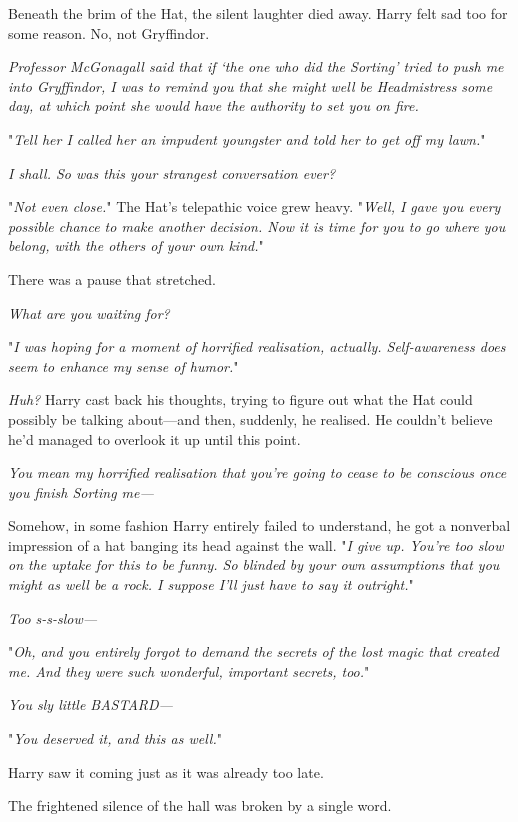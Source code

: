 Beneath the brim of the Hat, the silent laughter died away. Harry felt sad too
for some reason. No, not Gryffindor.

\emph{Professor McGonagall said that if `the one who did the Sorting' tried to
push me into Gryffindor, I was to remind you that she might well be
Headmistress some day, at which point she would have the authority to set you on
fire.}

"\emph{Tell her I called her an impudent youngster and told her to get off my
lawn.}"

\emph{I shall. So was this your strangest conversation ever?}

"\emph{Not even close.}" The Hat's telepathic voice grew heavy. "\emph{Well, I
gave you every possible chance to make another decision. Now it is time for you
to go where you belong, with the others of your own kind.}"

There was a pause that stretched.

\emph{What are you waiting for?}

"\emph{I was hoping for a moment of horrified realisation, actually.
Self-awareness does seem to enhance my sense of humor.}"

\emph{Huh?} Harry cast back his thoughts, trying to figure out what the Hat
could possibly be talking about---and then, suddenly, he realised. He couldn't
believe he'd managed to overlook it up until this point.

\emph{You mean my horrified realisation that you're going to cease to be
conscious once you finish Sorting me---}

Somehow, in some fashion Harry entirely failed to understand, he got a
nonverbal impression of a hat banging its head against the wall. "\emph{I give
up. You're too slow on the uptake for this to be funny. So blinded by your own
assumptions that you might as well be a rock. I suppose I'll just have to say
it outright.}"

\emph{Too s-s-slow---}

"\emph{Oh, and you entirely forgot to demand the secrets of the lost magic that
created me. And they were such wonderful, important secrets, too.}"

\emph{You sly little BASTARD---}

"\emph{You deserved it, and this as well.}"

Harry saw it coming just as it was already too late.

The frightened silence of the hall was broken by a single word.

